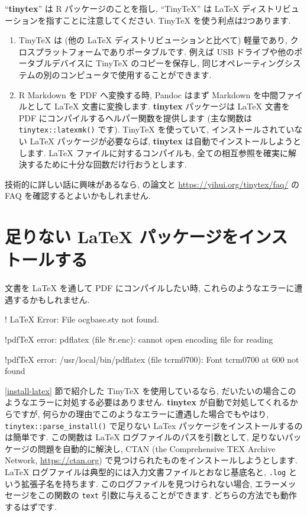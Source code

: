 \documentclass[
  11pt,
]{bxjsreport}
\newenvironment{Shaded}{\begin{snugshade}}{\end{snugshade}}
\newcommand{\NormalTok}[1]{#1}
\begin{document}
``\textbf{tinytex}'' は R パッケージのことを指し, ``TinyTeX'' は LaTeX ディストリビューションを指すことに注意してください. TinyTeX を使う利点は2つあります.

\begin{enumerate}
\def\labelenumi{\arabic{enumi}.}
\item
  TinyTeX は (他の LaTeX ディストリビューションと比べて) 軽量であり, クロスプラットフォームでありポータブルです. 例えば USB ドライブや他のポータブルデバイスに TinyTeX のコピーを保存し, 同じオペレーティングシステムの別のコンピュータで使用することができます.
\item
  R Markdown を PDF へ変換する時, Pandoc はまず Markdown を中間ファイルとして LaTeX 文書に変換します. \textbf{tinytex} パッケージは LaTeX 文書を PDF にコンパイルするヘルパー関数を提供します (主な関数は \texttt{tinytex::latexmk()} です). TinyTeX を使っていて, インストールされていない LaTeX パッケージが必要ならば, \textbf{tinytex} は自動でインストールしようとします. LaTeX ファイルに対するコンパイルも, 全ての相互参照を確実に解決するために十分な回数だけ行おうとします.
\end{enumerate}

技術的に詳しい話に興味があるなら, \textcite{tinytex2019} の論文と \url{https://yihui.org/tinytex/faq/} の FAQ を確認するとよいかもしれません.

\hypertarget{install-latex-pkgs}{%
\section{足りない LaTeX パッケージをインストールする}\label{install-latex-pkgs}}

文書を LaTeX を通して PDF にコンパイルしたい時, これらのようなエラーに遭遇するかもしれません.

\begin{Shaded}
\begin{Highlighting}[]
\NormalTok{! LaTeX Error: File \textasciigrave{}ocgbase.sty\textquotesingle{} not found.}

\NormalTok{!pdfTeX error: pdflatex (file 8r.enc):}
\NormalTok{  cannot open encoding file for reading}

\NormalTok{!pdfTeX error: /usr/local/bin/pdflatex (file tcrm0700):}
\NormalTok{  Font tcrm0700 at 600 not found}
\end{Highlighting}
\end{Shaded}

\ref{install-latex} 節で紹介した TinyTeX を使用しているなら, だいたいの場合このようなエラーに対処する必要はありません. \textbf{tinytex} \autocite{R-tinytex} が自動で対処してくれるからですが, 何らかの理由でこのようなエラーに遭遇した場合でもやはり, \texttt{tinytex::parse\_install()} で足りない LaTex パッケージをインストールするのは簡単です. この関数は LaTeX ログファイルのパスを引数として, 足りないパッケージの問題を自動的に解決し, CTAN (the Comprehensive TEX Archive Network, \url{https://ctan.org}) で見つけられたものをインストールしようとします. LaTeX ログファイルは典型的には入力文書ファイルとおなじ基底名と, \texttt{.log} という拡張子名を持ちます. このログファイルを見つけられない場合, エラーメッセージをこの関数の \texttt{text} 引数に与えることができます. どちらの方法でも動作するはずです.
\end{document}

